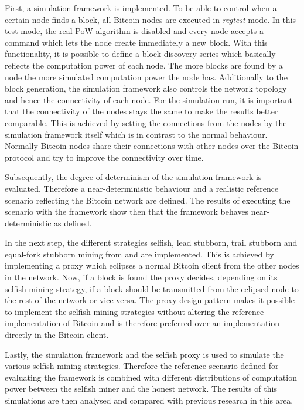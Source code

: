 First, a simulation framework is implemented.
To be able to control when a certain node finds a block, all Bitcoin nodes are executed in \textit{regtest} mode.
In this test mode, the real PoW-algorithm is disabled and every node accepts a command which lets the node create immediately a new block.
With this functionality, it is possible to define a block discovery series which basically reflects the computation power of each node.
The more blocks are found by a node the more simulated computation power the node has.
Additionally to the block generation, the simulation framework also controls the network topology and hence the connectivity of each node.
For the simulation run, it is important that the connectivity of the nodes stays the same to make the results better comparable.
This is achieved by setting the connections from the nodes by the simulation framework itself which is in contrast to the normal behaviour.
Normally Bitcoin nodes share their connections with other nodes over the Bitcoin protocol and try to improve the connectivity over time.

Subsequently, the degree of determinism of the simulation framework is evaluated.
Therefore a near-deterministic behaviour and a realistic reference scenario reflecting the Bitcoin network are defined.
The results of executing the scenario with the framework show then that the framework behaves near-deterministic as defined.

In the next step, the different strategies selfish, lead stubborn, trail stubborn and equal-fork stubborn mining from \cite{nayak2016stubborn} and \cite{eyal2014majority} are implemented.
This is achieved by implementing a proxy which eclipses a normal Bitcoin client from the other nodes in the network.
Now, if a block is found the proxy decides, depending on its selfish mining strategy, if a block should be transmitted from the eclipsed node to the rest of the network or vice versa.
The proxy design pattern makes it possible to implement the selfish mining strategies without altering the reference implementation of Bitcoin and is therefore preferred over an implementation directly in the Bitcoin client.

Lastly, the simulation framework and the selfish proxy is used to simulate the various selfish mining strategies.
Therefore the reference scenario defined for evaluating the framework is combined with different distributions of computation power between the selfish miner and the honest network.
The results of this simulations are then analysed and compared with previous research in this area.
